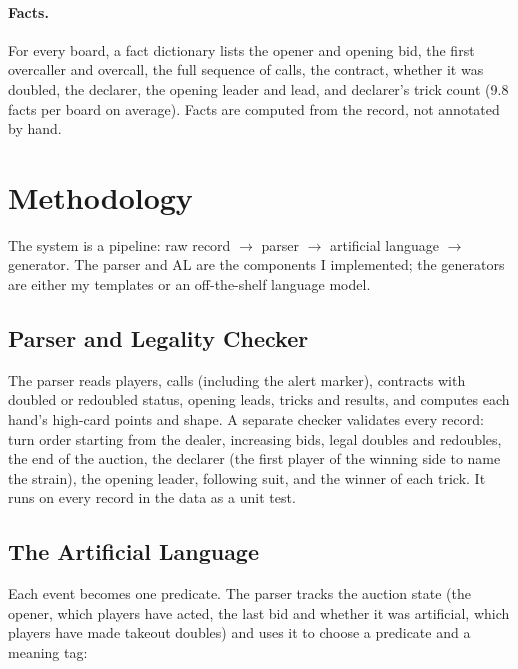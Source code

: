 \documentclass[11pt]{article}
\begin{document}
\paragraph{Facts.} For every board, a fact dictionary lists the opener and opening bid, the first overcaller and overcall, the full sequence of calls, the contract, whether it was doubled, the declarer, the opening leader and lead, and declarer's trick count (9.8 facts per board on average). Facts are computed from the record, not annotated by hand.

\section{Methodology}

The system is a pipeline: raw record $\rightarrow$ parser $\rightarrow$ artificial language $\rightarrow$ generator. The parser and AL are the components I implemented; the generators are either my templates or an off-the-shelf language model.

\subsection{Parser and Legality Checker}

The parser reads players, calls (including the alert marker), contracts with doubled or redoubled status, opening leads, tricks and results, and computes each hand's high-card points and shape. A separate checker validates every record: turn order starting from the dealer, increasing bids, legal doubles and redoubles, the end of the auction, the declarer (the first player of the winning side to name the strain), the opening leader, following suit, and the winner of each trick. It runs on every record in the data as a unit test.

\subsection{The Artificial Language}

Each event becomes one predicate. The parser tracks the auction state (the opener, which players have acted, the last bid and whether it was artificial, which players have made takeout doubles) and uses it to choose a predicate and a meaning tag:
\end{document}
